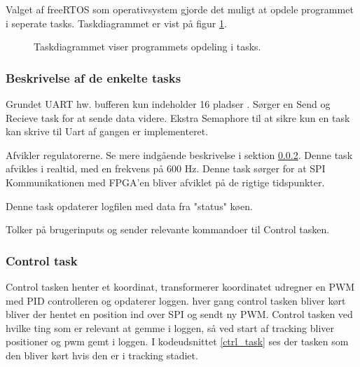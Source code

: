 Valget af freeRTOS som operativsystem gjorde det muligt at opdele programmet i seperate tasks. Taskdiagrammet er vist på figur \ref{fig:task_diagram}. 

\begin{figure}[!h]
\centering
\begin{tikzpicture}[node distance = 3.2cm]
	
\end{tikzpicture}
\caption[Task diagram]{Taskdiagrammet viser programmets opdeling i tasks.}
\label{fig:task_diagram}
\end{figure}

\subsubsection{Beskrivelse af de enkelte tasks}
\begin{description}
\itemsep-3pt
	\item[UART] Grundet UART hw. bufferen kun indeholder 16 pladser \citep[Side. 430]{lm3s6965}. Sørger en Send og Recieve task for at sende data videre. Ekstra Semaphore til at sikre kun en task kan skrive til Uart af gangen er implementeret.
	\item[Control] Afvikler regulatorerne. Se mere indgående beskrivelse i sektion \ref{sec:control_task}. Denne task afvikles i realtid, med en frekvens på 600 Hz. 
	Denne task sørger for at SPI Kommunikationen med FPGA'en bliver afviklet på de rigtige tidspunkter.
	\item[Logger] Denne task opdaterer logfilen med data fra "status" køen.
	\item[Interface] Tolker på brugerinputs og sender relevante kommandoer til Control tasken.
\end{description}


\subsubsection{Control task}
\label{sec:control_task}

Control tasken henter et koordinat, transformerer koordinatet udregner en PWM med PID controlleren og opdaterer loggen.
hver gang control tasken bliver kørt bliver der hentet en position ind over SPI og sendt ny PWM. 
Control tasken ved hvilke ting som er relevant at gemme i loggen, så ved start af tracking bliver positioner og pwm gemt i loggen.
I kodeudsnittet \ref{ctrl_task} ses der tasken som den bliver kørt hvis den er i tracking stadiet.


